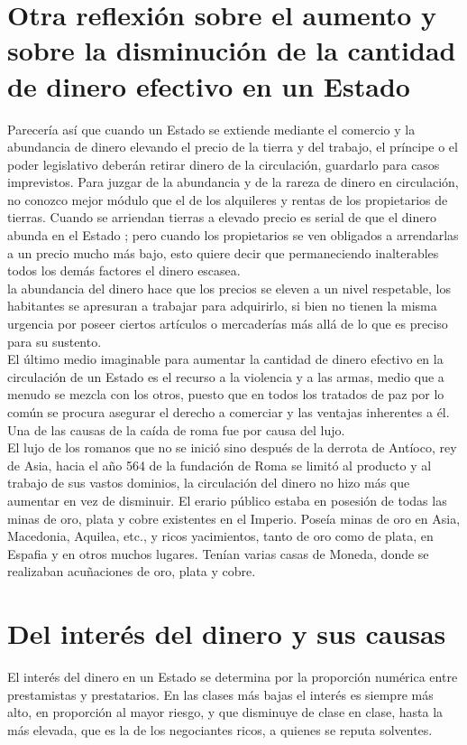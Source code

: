 \documentclass[10pt]{article}
\begin{document}
\begin{multicols}{1}
\section*{Otra reflexión sobre el aumento y sobre la disminución de la cantidad de dinero efectivo en un Estado}
Parecería así que cuando un Estado se extiende mediante el comercio y la abundancia de dinero elevando el precio de la tierra y del trabajo, el príncipe o el poder legislativo deberán retirar dinero de la circulación, guardarlo para casos imprevistos. Para juzgar de la abundancia y de la rareza de dinero en circulación, no conozco mejor módulo que el de los alquileres y rentas de los propietarios de tierras. Cuando se arriendan tierras a elevado precio es serial de que el dinero abunda en el Estado ; pero cuando los propietarios se ven obligados a arrendarlas a un precio mucho más bajo, esto quiere decir que permaneciendo inalterables todos los demás factores el dinero escasea. \\
la abundancia del dinero hace que los precios se eleven a un nivel respetable, los habitantes se apresuran a trabajar para adquirirlo, si bien no tienen la misma urgencia por poseer ciertos artículos o mercaderías más allá de lo que es preciso para su sustento. \\
El último medio imaginable para aumentar la cantidad de dinero efectivo en la circulación de un Estado es el recurso a la violencia y a las armas, medio que a menudo se mezcla con los otros, puesto que en todos los tratados de paz por lo común se procura asegurar el derecho a comerciar y las ventajas inherentes a él. Una de las causas de la caída de roma fue por causa del lujo.\\
El lujo de los romanos que no se inició sino después de la derrota de Antíoco, rey de Asia, hacia el año 564 de la fundación de Roma se limitó al producto y al trabajo de sus vastos dominios, la circulación del dinero no hizo más que aumentar en vez de disminuir. El erario público estaba en posesión de todas las minas de oro, plata y cobre existentes en el Imperio. Poseía minas de oro en Asia, Macedonia, Aquilea, etc., y ricos yacimientos, tanto de oro como de plata, en Espafia y en otros muchos lugares. Tenían varias casas de Moneda, donde se realizaban acuñaciones de oro, plata y cobre.
\section*{Del interés del dinero y sus causas}
El interés del dinero en un Estado se determina por la proporción numérica entre prestamistas y prestatarios. En las clases más bajas el interés es siempre más alto, en proporción al mayor riesgo, y que disminuye de clase en clase, hasta la más elevada, que es la de los negociantes ricos, a quienes se reputa solventes.

\end{multicols}
\end{document}
